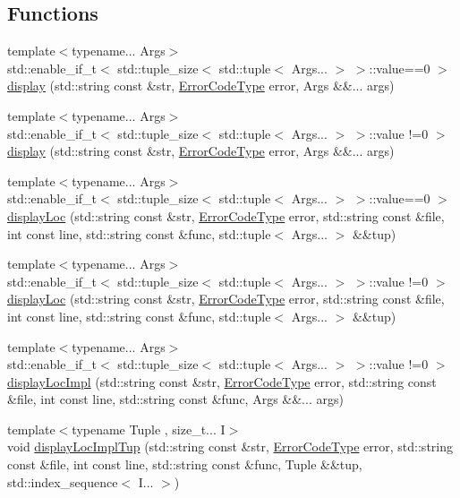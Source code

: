 \subsection*{Functions}
\begin{DoxyCompactItemize}
\item 
{\footnotesize template$<$typename... Args$>$ }\\std\+::enable\+\_\+if\+\_\+t$<$ std\+::tuple\+\_\+size$<$ std\+::tuple$<$ Args... $>$ $>$\+::value==0 $>$ \hyperlink{namespacevt_1_1error_a1b5e48ed4efcd084a1f7b0ee9bd65b14}{display} (std\+::string const \&str, \hyperlink{namespacevt_a793764d753923abc3d32929870beb485}{Error\+Code\+Type} error, Args \&\&... args)
\item 
{\footnotesize template$<$typename... Args$>$ }\\std\+::enable\+\_\+if\+\_\+t$<$ std\+::tuple\+\_\+size$<$ std\+::tuple$<$ Args... $>$ $>$\+::value !=0 $>$ \hyperlink{namespacevt_1_1error_a37c5633fbfd11a19486f467819a330f5}{display} (std\+::string const \&str, \hyperlink{namespacevt_a793764d753923abc3d32929870beb485}{Error\+Code\+Type} error, Args \&\&... args)
\item 
{\footnotesize template$<$typename... Args$>$ }\\std\+::enable\+\_\+if\+\_\+t$<$ std\+::tuple\+\_\+size$<$ std\+::tuple$<$ Args... $>$ $>$\+::value==0 $>$ \hyperlink{namespacevt_1_1error_aa70787af3ebae733184d780cc5678791}{display\+Loc} (std\+::string const \&str, \hyperlink{namespacevt_a793764d753923abc3d32929870beb485}{Error\+Code\+Type} error, std\+::string const \&file, int const line, std\+::string const \&func, std\+::tuple$<$ Args... $>$ \&\&tup)
\item 
{\footnotesize template$<$typename... Args$>$ }\\std\+::enable\+\_\+if\+\_\+t$<$ std\+::tuple\+\_\+size$<$ std\+::tuple$<$ Args... $>$ $>$\+::value !=0 $>$ \hyperlink{namespacevt_1_1error_acc630b11da3783f4c6b4eab8f9d9c081}{display\+Loc} (std\+::string const \&str, \hyperlink{namespacevt_a793764d753923abc3d32929870beb485}{Error\+Code\+Type} error, std\+::string const \&file, int const line, std\+::string const \&func, std\+::tuple$<$ Args... $>$ \&\&tup)
\item 
{\footnotesize template$<$typename... Args$>$ }\\std\+::enable\+\_\+if\+\_\+t$<$ std\+::tuple\+\_\+size$<$ std\+::tuple$<$ Args... $>$ $>$\+::value !=0 $>$ \hyperlink{namespacevt_1_1error_a72bed290e73b0ff6a5f0c769c14c82f5}{display\+Loc\+Impl} (std\+::string const \&str, \hyperlink{namespacevt_a793764d753923abc3d32929870beb485}{Error\+Code\+Type} error, std\+::string const \&file, int const line, std\+::string const \&func, Args \&\&... args)
\item 
{\footnotesize template$<$typename Tuple , size\+\_\+t... I$>$ }\\void \hyperlink{namespacevt_1_1error_a8ba52013f613050350ba268f0efc3074}{display\+Loc\+Impl\+Tup} (std\+::string const \&str, \hyperlink{namespacevt_a793764d753923abc3d32929870beb485}{Error\+Code\+Type} error, std\+::string const \&file, int const line, std\+::string const \&func, Tuple \&\&tup, std\+::index\+\_\+sequence$<$ I... $>$)
\end{DoxyCompactItemize}


